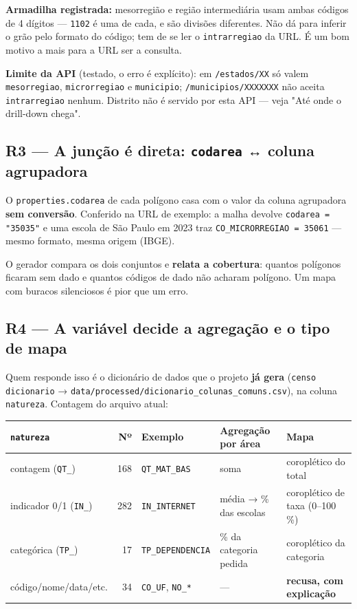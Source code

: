 \documentclass[11pt]{article}
\begin{document}
\textbf{Armadilha registrada:} mesorregião e região intermediária usam ambas
códigos de 4 dígitos — \texttt{1102} é uma de cada, e são divisões diferentes. Não
dá para inferir o grão pelo formato do código; tem de se ler o
\texttt{intrarregiao} da URL. É um bom motivo a mais para a URL ser a consulta.

\textbf{Limite da API} (testado, o erro é explícito): em \texttt{/estados/XX} só valem
\texttt{mesorregiao}, \texttt{microrregiao} e \texttt{municipio}; \texttt{/municipios/XXXXXXX} não
aceita \texttt{intrarregiao} nenhum. Distrito não é servido por esta API — veja
"Até onde o drill-down chega".
\subsection{R3 — A junção é direta: \texttt{codarea} ↔ coluna agrupadora}
\label{sec:org33f07c8}

O \texttt{properties.codarea} de cada polígono casa com o valor da coluna
agrupadora \textbf{sem conversão}. Conferido na URL de exemplo: a malha devolve
\texttt{codarea = "35035"} e uma escola de São Paulo em 2023 traz
\texttt{CO\_MICRORREGIAO = 35061} — mesmo formato, mesma origem (IBGE).

O gerador compara os dois conjuntos e \textbf{relata a cobertura}: quantos
polígonos ficaram sem dado e quantos códigos de dado não acharam polígono.
Um mapa com buracos silenciosos é pior que um erro.
\subsection{R4 — A variável decide a agregação e o tipo de mapa}
\label{sec:org98b4cd0}

Quem responde isso é o dicionário de dados que o projeto \textbf{já gera}
(\texttt{censo dicionario} → \texttt{data/processed/dicionario\_colunas\_comuns.csv}), na
coluna \texttt{natureza}. Contagem do arquivo atual:

\begin{center}
\begin{tabular}{lrlll}
\texttt{natureza} & Nº & Exemplo & Agregação por área & Mapa\\
\hline
contagem (\texttt{QT\_}) & 168 & \texttt{QT\_MAT\_BAS} & soma & coroplético do total\\
indicador 0/1 (\texttt{IN\_}) & 282 & \texttt{IN\_INTERNET} & média → \% das escolas & coroplético de taxa (0–100 \%)\\
categórica (\texttt{TP\_}) & 17 & \texttt{TP\_DEPENDENCIA} & \% da categoria pedida & coroplético da categoria\\
código/nome/data/etc. & 34 & \texttt{CO\_UF}, \texttt{NO\_*} & — & \textbf{recusa, com explicação}\\
\end{tabular}
\end{center}
\end{document}
